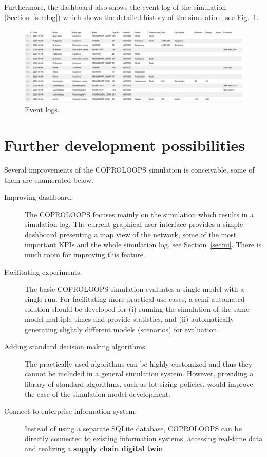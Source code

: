 \documentclass{article}
\newcommand{\NAME}{COPROLOOPS }
\begin{document}
Furthermore, the dashboard also shows the event log of the simulation (Section~\ref{sec:log}) which shows the detailed history of the simulation, see Fig.~\ref{fig:gui3}.

\begin{figure}[ht!]
	\center
	\includegraphics[width=\textwidth]{gui3.png}
	\caption{Event logs.}\label{fig:gui3}
\end{figure}


\section{Further development possibilities}

Several improvements of the \NAME simulation is conceivable, some of them are enumerated below.

\begin{description}
\item[Improving dashboard.] The \NAME focuses mainly on the simulation which results in a simulation log. The current graphical user interface provides a simple dashboard presenting a map view of the network, some of the most important KPIs and the whole simulation log, see Section~\ref{sec:ui}. There is much room for improving this feature.

\item[Facilitating experiments.] The basic \NAME simulation evaluates a single model with a single run. For facilitating more practical use cases, a semi-automated solution should be developed for (i) running the simulation of the same model multiple times and provide statistics, and (ii) automatically generating slightly different models (scenarios) for evaluation.

\item[Adding standard decision making algorithms.] The practically used algorithms can be highly customized and thus they cannot be included in a general simulation system. However, providing a library of standard algorithms, such as lot sizing policies, would improve the ease of the simulation model development.

\item[Connect to enterprise information system.] Instead of using a separate SQLite database, \NAME can be directly connected to existing information systems, accessing real-time data and realizing a \textbf{supply chain digital twin}.
\end{description}
\end{document}
